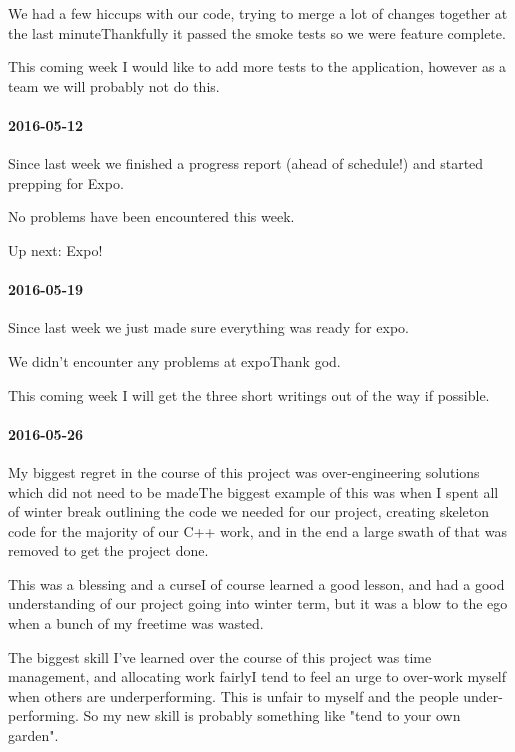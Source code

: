 We had a few hiccups with our code, trying to merge a lot of changes together at the last minuteThankfully it passed the smoke tests so we were feature complete.

This coming week I would like to add more tests to the application, however as a team we will probably not do this.

\paragraph{2016-05-12}

Since last week we finished a progress report (ahead of schedule!) and started prepping for Expo.

No problems have been encountered this week.

Up next: Expo!

\paragraph{2016-05-19}

Since last week we just made sure everything was ready for expo.

We didn't encounter any problems at expoThank god.

This coming week I will get the three short writings out of the way if possible.

\paragraph{2016-05-26}

My biggest regret in the course of this project was over-engineering solutions which did not need to be madeThe biggest example of this was when I spent all of winter break outlining the code we needed for our project, creating skeleton code for the majority of our C++ work, and in the end a large swath of that was removed to get the project done.

This was a blessing and a curseI of course learned a good lesson, and had a good understanding of our project going into winter term, but it was a blow to the ego when a bunch of my freetime was wasted.

The biggest skill I've learned over the course of this project was time management, and allocating work fairlyI tend to feel an urge to over-work myself when others are underperforming.
This is unfair to myself and the people under-performing.
So my new skill is probably something like "tend to your own garden".

